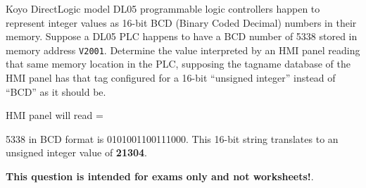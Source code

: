 

Koyo DirectLogic model DL05 programmable logic controllers happen to represent integer values as 16-bit BCD (Binary Coded Decimal) numbers in their memory.  Suppose a DL05 PLC happens to have a BCD number of 5338 stored in memory address {\tt V2001}.  Determine the value interpreted by an HMI panel reading that same memory location in the PLC, supposing the tagname database of the HMI panel has that tag configured for a 16-bit ``unsigned integer'' instead of ``BCD'' as it should be.

\vskip 10pt

HMI panel will read = \underbar{\hskip 50pt}







5338 in BCD format is 0101001100111000.  This 16-bit string translates to an unsigned integer value of {\bf 21304}.







{\bf This question is intended for exams only and not worksheets!}.


